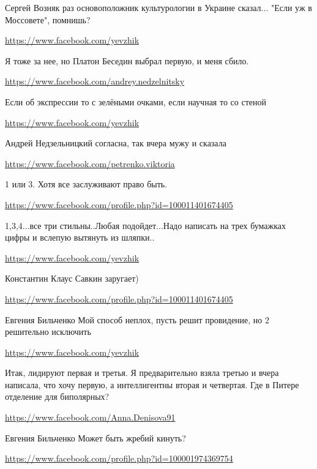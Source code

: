 \documentclass[a4paper,11pt]{extreport}
\begin{document}
\begin{itemize}
\begin{itemize}
Сергей Возняк раз основоположник культурологии в Украине сказал... "Если уж в Моссовете", помнишь?

\end{itemize}
\url{https://www.facebook.com/yevzhik}

Я тоже за нее, но Платон Беседин выбрал первую, и меня сбило.

\url{https://www.facebook.com/andrey.nedzelnitsky}

Если об экспрессии то с зелёными очками, если научная то со стеной

\begin{itemize}
\url{https://www.facebook.com/yevzhik}

Андрей Недзельницкий согласна, так вчера мужу и сказала

\end{itemize}
\url{https://www.facebook.com/petrenko.viktoria}

1 или 3. Хотя все заслуживают право быть.

\url{https://www.facebook.com/profile.php?id=100011401674405}

1,3,4...все три стильны..Любая подойдет...Надо написать на трех бумажках цифры и вслепую вытянуть из шляпки..

\begin{itemize}
\url{https://www.facebook.com/yevzhik}

Константин Клаус Савкин заругает)

\url{https://www.facebook.com/profile.php?id=100011401674405}

Евгения Бильченко Мой способ неплох, пусть решит провидение, но 2 решительно исключить

\end{itemize}
\url{https://www.facebook.com/yevzhik}

Итак, лидируют первая и третья. Я предварительно взяла третью и вчера написала, что хочу первую, а интеллигентны вторая и четвертая. Где в Питере отделение для биполярных?

\begin{itemize}
\url{https://www.facebook.com/Anna.Denisova91}

Евгения Бильченко Может быть жребий кинуть?

\url{https://www.facebook.com/profile.php?id=100001974369754}


\end{itemize}
\end{itemize}
\end{document}
